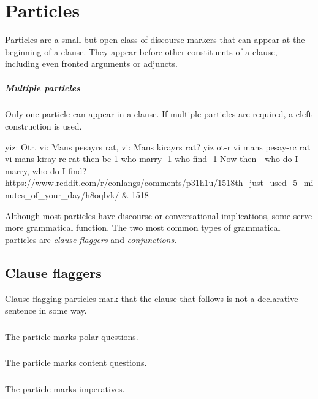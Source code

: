 \setchapterpreamble[u]{\margintoc}
\chapter{Particles}
Particles are a small but open class of discourse markers that can appear at the beginning of a clause. They appear before other constituents of a clause, including even fronted arguments or adjuncts.

\paragraph{Multiple particles}
Only one particle can appear in a clause. If multiple particles are required, a cleft construction is used.

\begin{example*}
    \script yiz: Otr. vi: Mans pesayrs rat, vi: Mans kirayrs rat?
    \bits  yiz ot-r vi mans pesay-rc rat vi mans kiray-rc rat
    \gloss then be-{1}  who marry- {1}  who find- {1}
    \tr Now then---who do I marry, who do I find?
    \smoyd https://www.reddit.com/r/conlangs/comments/p31h1u/1518th_just_used_5_minutes_of_your_day/h8oqlvk/ & 1518
\end{example*}  

Although most particles have discourse or conversational implications, some serve more grammatical function. The two most common types of grammatical particles are \emph{clause flaggers} and \emph{conjunctions}.

\section{Clause flaggers}
Clause-flagging particles mark that the clause that follows is not a declarative sentence in some way.

\subsection{}
The particle  marks polar questions.

\subsection{}
The particle  marks content questions.

\subsection{}
The particle  marks imperatives.


